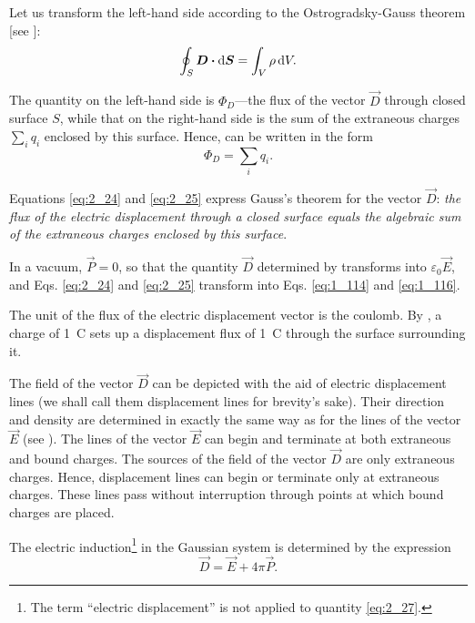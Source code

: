 \noindent
Let us transform the left-hand side according to the Ostrogradsky-Gauss theorem [see ]:
\begin{equation}\label{eq:2_24}
    \oint_S \boldsymbol{D} \boldsymbol{\cdot} \mathrm{d}\boldsymbol{S} = \int_V \rho\, \mathrm{d} V.
\end{equation}

\noindent
The quantity on the left-hand side is $\Phi_D$---the flux of the vector $\vec{D}$ through closed surface $S$, while that on the right-hand side is the sum of the extraneous charges $\sum_iq_i$ enclosed by this surface. Hence,  can be written in the form
\begin{equation}\label{eq:2_25}
    \Phi_D = \sum_i q_i.
\end{equation}

\noindent
Equations \eqref{eq:2_24} and \eqref{eq:2_25} express Gauss's theorem for the vector $\vec{D}$: \textit{the flux of the electric displacement through a closed surface equals the algebraic sum of the extraneous charges enclosed by this surface}.

In a vacuum, $\vec{P}=0$, so that the quantity $\vec{D}$ determined by  transforms into $\varepsilon_0\vec{E}$, and Eqs. \eqref{eq:2_24} and \eqref{eq:2_25} transform into Eqs. \eqref{eq:1_114} and \eqref{eq:1_116}.

The unit of the flux of the electric displacement vector is the coulomb. By , a charge of \SI{1}{\coulomb} sets up a displacement flux of \SI{1}{\coulomb} through the surface surrounding it.

The field of the vector $\vec{D}$ can be depicted with the aid of electric displacement lines (we shall call them displacement lines for brevity's sake). Their direction and density are determined in exactly the same way as for the lines of the vector $\vec{E}$ (see ). The lines of the vector $\vec{E}$ can begin and terminate at both extraneous and bound charges. The sources of the field of the vector $\vec{D}$ are only extraneous charges. Hence, displacement lines can begin or terminate only at extraneous charges. These lines pass without interruption through points at which bound charges are placed.

The electric induction\footnote{The term ``electric displacement'' is not applied to quantity \eqref{eq:2_27}.} in the Gaussian system is determined by the expression
\begin{equation}\label{eq:2_26}
    \vec{D} = \vec{E} + 4\pi\vec{P}.
\end{equation}

